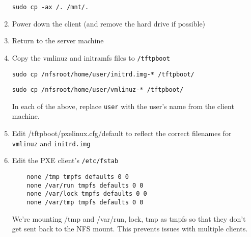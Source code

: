\documentclass{article}
\begin{document}
\begin{flushleft}
\begin{enumerate}
  \verb|sudo cp -ax /. /mnt/.|

  \item Power down the client (and remove the hard drive if possible)
  \item Return to the server machine
  \item Copy the vmlinuz and initramfs files to \verb|/tftpboot|

  \verb|sudo cp /nfsroot/home/user/initrd.img-* /tftpboot/|

  \verb|sudo cp /nfsroot/home/user/vmlinuz-* /tftpboot/|

  In each of the above, replace \verb|user| with the user's name from the client machine.

  \item Edit /tftpboot/pxelinux.cfg/default to reflect the correct filenames for \verb|vmlinuz| and \verb|initrd.img|

  \item Edit the PXE client's \verb|/etc/fstab|
  \begin{verbatim}
    none /tmp tmpfs defaults 0 0
    none /var/run tmpfs defaults 0 0
    none /var/lock tmpfs defaults 0 0
    none /var/tmp tmpfs defaults 0 0
  \end{verbatim}

  We're mounting /tmp and /var/{run, lock, tmp} as tmpfs so that they don't get sent back to the NFS mount.  This prevents issues with multiple clients.
\end{enumerate}
\end{flushleft}
\end{document}
